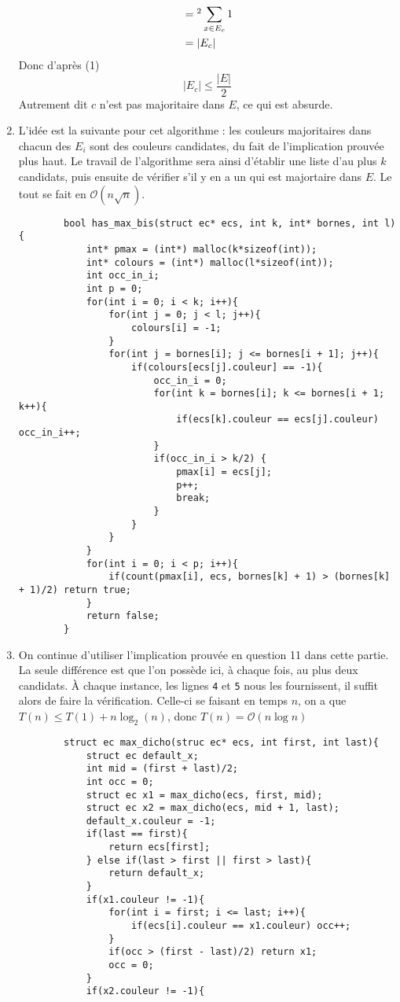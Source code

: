 \documentclass[10pt]{article}
\newcommand{\f}[1]{\texttt{#1}}
\begin{document}
\begin{enumerate}[start=9,label={\bfseries \arabic*}]
\begin{align*}
						          &=\footnotemark[2] \sum_{x\in E_c}1\\
							      &= |E_c|
		\end{align*}
		Donc d'après (1) \[|E_c|\leq \frac{|E|}2\]
		Autrement dit $c$ n'est pas majoritaire dans $E$, ce qui est absurde.
		\item L'idée est la suivante pour cet algorithme : les couleurs majoritaires dans chacun des $E_i$ sont des couleurs candidates, du fait de l'implication prouvée plus haut. Le travail de l'algorithme sera ainsi d'établir une liste d'au plus $k$ candidats, puis ensuite de vérifier s'il y en a un qui est majortaire dans $E$. Le tout se fait en $\mathcal O(n\sqrt{n})$.
		\begin{lstlisting}
		bool has_max_bis(struct ec* ecs, int k, int* bornes, int l){
			int* pmax = (int*) malloc(k*sizeof(int));
			int* colours = (int*) malloc(l*sizeof(int));
			int occ_in_i;
			int p = 0;
			for(int i = 0; i < k; i++){
				for(int j = 0; j < l; j++){
					colours[i] = -1;
				}
				for(int j = bornes[i]; j <= bornes[i + 1]; j++){
					if(colours[ecs[j].couleur] == -1){
						occ_in_i = 0;
						for(int k = bornes[i]; k <= bornes[i + 1; k++){
							if(ecs[k].couleur == ecs[j].couleur) occ_in_i++;
						}
						if(occ_in_i > k/2) {
							pmax[i] = ecs[j];
							p++;
							break;
						}
					}
				}
			}
			for(int i = 0; i < p; i++){
				if(count(pmax[i], ecs, bornes[k] + 1) > (bornes[k] + 1)/2) return true;
			}
			return false;
		}
		\end{lstlisting}
		\item On continue d'utiliser l'implication prouvée en question 11 dans cette partie. La seule différence est que l'on possède ici, à chaque fois, au plus deux candidats. À chaque instance, les lignes \f{4} et \f{5} nous les fournissent, il suffit alors de faire la vérification. Celle-ci se faisant en temps $n$, on a que $T(n)\leq T(1)+n\log_2(n)$, donc $T(n)=\mathcal O(n\log n)$
		\begin{lstlisting}
		struct ec max_dicho(struc ec* ecs, int first, int last){
			struct ec default_x;
			int mid = (first + last)/2;
			int occ = 0;
			struct ec x1 = max_dicho(ecs, first, mid);
			struct ec x2 = max_dicho(ecs, mid + 1, last);
			default_x.couleur = -1;
			if(last == first){
				return ecs[first];
			} else if(last > first || first > last){
				return default_x;
			}
			if(x1.couleur != -1){
				for(int i = first; i <= last; i++){
					if(ecs[i].couleur == x1.couleur) occ++;
				}
				if(occ > (first - last)/2) return x1;
				occ = 0;
			}
			if(x2.couleur != -1){

\end{lstlisting}
\end{enumerate}
\end{document}
